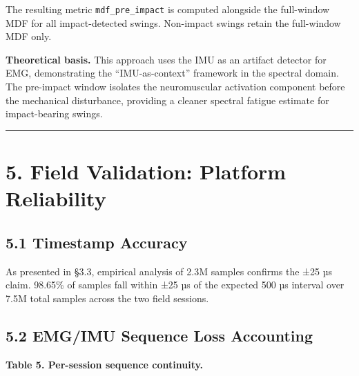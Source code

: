 \documentclass[sensors,article,submit,pdftex,moreauthors]{Definitions/mdpi}
\begin{document}
The resulting metric \texttt{mdf\_pre\_impact} is computed alongside the full-window MDF for all
impact-detected swings. Non-impact swings retain the full-window MDF only.

\textbf{Theoretical basis.} This approach uses the IMU as an artifact detector for EMG, demonstrating
the ``IMU-as-context'' framework in the spectral domain. The pre-impact window isolates the
neuromuscular activation component before the mechanical disturbance, providing a cleaner
spectral fatigue estimate for impact-bearing swings.

\begin{center}\rule{0.5\linewidth}{0.5pt}\end{center}

\section{5. Field Validation: Platform Reliability}\label{field-validation-platform-reliability}

\subsection{5.1 Timestamp Accuracy}\label{timestamp-accuracy}

As presented in §3.3, empirical analysis of 2.3M samples confirms the ±25 µs claim.
98.65\% of samples fall within ±25 µs of the expected 500 µs interval over 7.5M total
samples across the two field sessions.

\subsection{5.2 EMG/IMU Sequence Loss Accounting}\label{emgimu-sequence-loss-accounting}

\textbf{Table 5. Per-session sequence continuity.}
\end{document}
